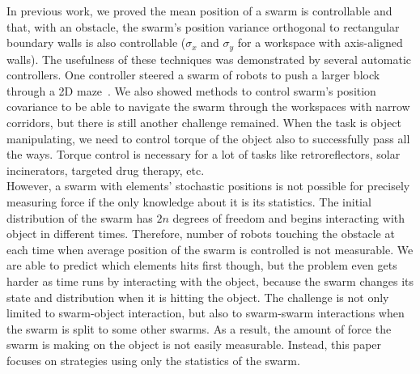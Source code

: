 In previous work, we proved the mean position of a swarm is controllable and that, with an obstacle, the swarm's position variance orthogonal to rectangular boundary walls  is also controllable
($\sigma_x$ and $\sigma_y$ for a workspace with axis-aligned walls). 
The usefulness of these techniques was demonstrated by several automatic controllers. One controller steered a swarm of robots to push a larger block through a 2D maze~\cite{ShahrokhiIROS2015}. 
We also showed methods to control swarm's position covariance to be able to navigate the swarm through the workspaces with narrow corridors, but there is still another challenge remained. When the task is object manipulating, we need to control torque of the object also to successfully pass all the ways. Torque control is necessary for a lot of tasks like retroreflectors, solar incinerators, targeted drug therapy, etc.\\
However, a swarm with elements' stochastic positions is not possible for precisely measuring force if the only knowledge about it is its statistics. The initial distribution of the swarm has $2n$ degrees of freedom and begins interacting with object in different times. Therefore, number of robots touching the obstacle at each time when average position of the swarm is controlled is not measurable. We are able to predict which elements hits first though, but the problem even gets harder as time runs by interacting with the object, because the swarm changes its state and distribution when it is hitting the object. The challenge is not only limited to swarm-object interaction, but also to swarm-swarm interactions when the swarm is split to some other swarms. As a result, the amount of force the swarm is making on the object is not easily measurable. Instead, this paper focuses on strategies using only the statistics of the swarm.




